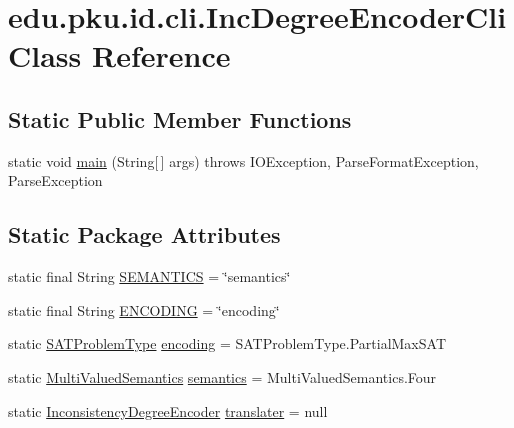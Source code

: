 \hypertarget{classedu_1_1pku_1_1id_1_1cli_1_1_inc_degree_encoder_cli}{
\section{edu.pku.id.cli.IncDegreeEncoderCli Class Reference}
\label{classedu_1_1pku_1_1id_1_1cli_1_1_inc_degree_encoder_cli}
}
\subsection*{Static Public Member Functions}
\begin{DoxyCompactItemize}
\item 
static void \hyperlink{classedu_1_1pku_1_1id_1_1cli_1_1_inc_degree_encoder_cli_ad7bb9174fe4c8dea7de3be178e96fa5b}{main} (String\mbox{[}$\,$\mbox{]} args)  throws IOException, 			ParseFormatException, ParseException 
\end{DoxyCompactItemize}
\subsection*{Static Package Attributes}
\begin{DoxyCompactItemize}
\item 
static final String \hyperlink{classedu_1_1pku_1_1id_1_1cli_1_1_inc_degree_encoder_cli_a8101cc9a1de794e92c90684af9eac542}{SEMANTICS} = \char`\"{}semantics\char`\"{}
\item 
static final String \hyperlink{classedu_1_1pku_1_1id_1_1cli_1_1_inc_degree_encoder_cli_adb3c68064b7fc3ced3f88f2d96f8d66f}{ENCODING} = \char`\"{}encoding\char`\"{}
\item 
static \hyperlink{namespaceedu_1_1pku_1_1id_a7936f4efdc70b70b965d63bd005a2513}{SATProblemType} \hyperlink{classedu_1_1pku_1_1id_1_1cli_1_1_inc_degree_encoder_cli_a562638c7be6fe54ed7ea26ce25c431ce}{encoding} = SATProblemType.PartialMaxSAT
\item 
static \hyperlink{namespaceedu_1_1pku_1_1id_ad71ddcb0be4b31cdeeb2a5d755309f2d}{MultiValuedSemantics} \hyperlink{classedu_1_1pku_1_1id_1_1cli_1_1_inc_degree_encoder_cli_a437285cadf2e4a3e6314a7611bf0b562}{semantics} = MultiValuedSemantics.Four
\item 
static \hyperlink{classedu_1_1pku_1_1id_1_1_inconsistency_degree_encoder}{InconsistencyDegreeEncoder} \hyperlink{classedu_1_1pku_1_1id_1_1cli_1_1_inc_degree_encoder_cli_a618aef66b986539a5dd9f2e14655041d}{translater} = null
\end{DoxyCompactItemize}


